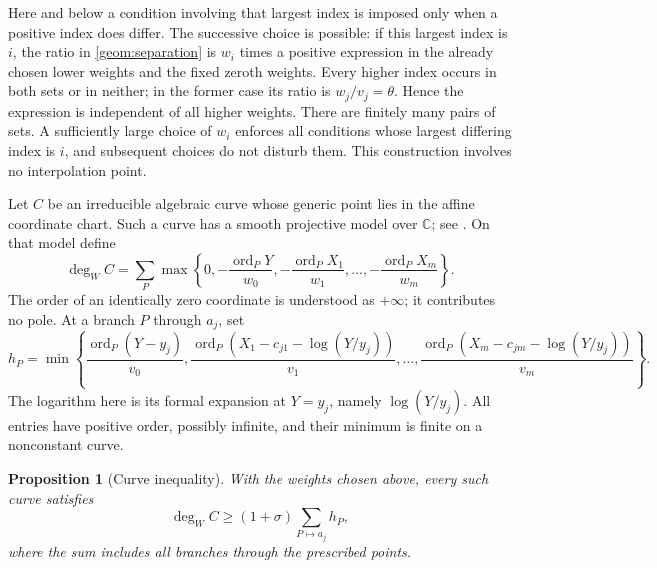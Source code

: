 \documentclass[11pt]{article}
\newcommand{\CC}{\mathbb C}
\newtheorem{proposition}[theorem]{Proposition}
\theoremstyle{definition}
\theoremstyle{remark}
\numberwithin{equation}{section}
\begin{document}
Here and below a condition involving that largest index is imposed only
when a positive index does differ. The successive choice is possible:
if this largest index is $i$, the ratio in \eqref{geom:separation} is
$w_i$ times a positive expression in the already chosen lower weights
and the fixed zeroth weights. Every higher index occurs in both sets or
in neither; in the former case its ratio is $w_j/v_j=\theta$. Hence the
expression is independent of all higher weights. There are finitely many
pairs of sets. A sufficiently large choice of $w_i$ enforces all
conditions whose largest differing index is $i$, and subsequent choices
do not disturb them. This construction involves no interpolation point.

Let $C$ be an irreducible algebraic curve whose generic point lies in the
affine coordinate chart. Such a curve has a smooth projective model over
$\CC$; see \cite[Theorem~53.2.6 and Lemma~53.2.8, Tag~0BXX]{stacks}.
On that model define
\begin{equation}
\label{geom:curve-degree}
 \deg_W C=
 \sum_P\max\left\{0,-\frac{\operatorname{ord}_P Y}{w_0},
                  -\frac{\operatorname{ord}_P X_1}{w_1},\ldots,
                  -\frac{\operatorname{ord}_P X_m}{w_m}\right\}.
\end{equation}
The order of an identically zero coordinate is understood as $+\infty$;
it contributes no pole. At a branch $P$ through $a_j$, set
\begin{equation}
\label{geom:branch-contact}
 h_P=\min\left\{
 \frac{\operatorname{ord}_P(Y-y_j)}{v_0},
 \frac{\operatorname{ord}_P(X_1-c_{j1}-\log(Y/y_j))}{v_1},\ldots,
 \frac{\operatorname{ord}_P(X_m-c_{jm}-\log(Y/y_j))}{v_m}
 \right\}.
\end{equation}
The logarithm here is its formal expansion at $Y=y_j$, namely $\log(Y/y_j)$. All entries have
positive order, possibly infinite, and their minimum is finite on a
nonconstant curve.

\begin{proposition}[Curve inequality]
\label{geom:curve-inequality}
With the weights chosen above, every such curve satisfies
\begin{equation}
\label{geom:curve-bound}
 \deg_W C\ge(1+\sigma)\sum_{P\mapsto a_j}h_P,
\end{equation}
where the sum includes all branches through the prescribed points.
\end{proposition}
\end{document}
